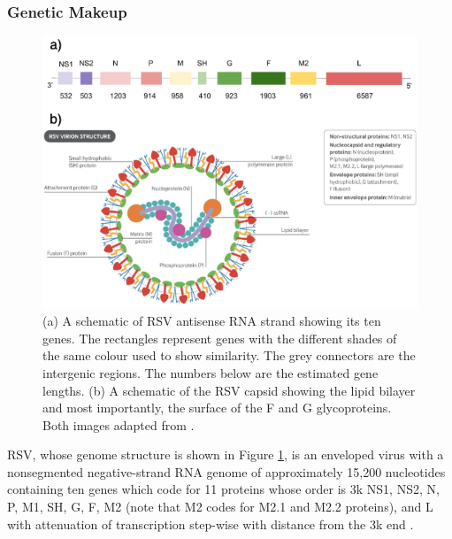 \documentclass[10pt, a4paper]{article}
\begin{document}
\newpage

\subsubsection{Genetic Makeup}
\label{sec:orgfdede1a}
\begin{figure}[h!]
\centering
\includegraphics[width=1.0\textwidth]{../Figures/Schematic of RSV.png}
\caption[RSV Capsid]{\label{fig:org069c02c}(a) A schematic of RSV antisense RNA strand showing its ten genes. The rectangles represent genes with the different shades of the same colour used to show similarity. The grey connectors are the intergenic regions. The numbers below are the estimated gene lengths. (b) A schematic of the RSV capsid showing the lipid bilayer and most importantly, the surface of the F and G glycoproteins. Both images adapted from \cite{namRespiratorySyncytialVirus2019}.}
\end{figure}

RSV, whose genome structure is shown in Figure \ref{fig:org069c02c}, is an enveloped virus with a
nonsegmented negative-strand RNA genome of approximately 15,200 nucleotides
containing ten genes which code for 11 proteins whose order is 3k NS1, NS2, N,
P, M1, SH, G, F, M2 (note that M2 codes for M2.1 and M2.2 proteins), and L with
attenuation of transcription step-wise with distance from the 3k end
\cite{caneMolecularEpidemiologyRespiratory2001}.
\end{document}
